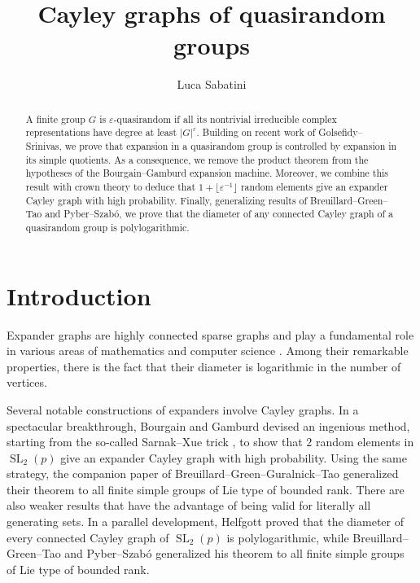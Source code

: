 \documentclass[11pt,reqno]{amsart}
\author[Luca Sabatini]{Luca Sabatini}
\numberwithin{equation}{section}
\theoremstyle{definition}
\theoremstyle{remark}
\newcommand{\SL}{\mathop{\mathrm{SL}}}
\begin{document}
 
 \title[Cayley graphs of quasirandom groups]{Cayley graphs of quasirandom groups} 

\maketitle 

\begin{abstract} 
A finite group $G$ is $\varepsilon$-quasirandom
if all its nontrivial irreducible complex representations
have degree at least $|G|^\varepsilon$.
Building on recent work of Golsefidy--Srinivas,
we prove that expansion in a quasirandom group is controlled by
expansion in its simple quotients.
As a consequence, we remove the product theorem from the hypotheses of
the Bourgain--Gamburd expansion machine.
Moreover, we combine this result with crown theory to deduce that $1 + \lfloor \varepsilon^{-1} \rfloor$
random elements give an expander Cayley graph with high probability.
Finally, generalizing results of Breuillard--Green--Tao and Pyber--Szab\'o,
we prove that the diameter of any connected Cayley graph of a quasirandom group is polylogarithmic.
\end{abstract} 


\vspace{0.2cm}
\section{Introduction} 

Expander graphs are highly connected sparse graphs and play a fundamental role
in various areas of mathematics and computer science \cite{HLW06,Lub12}.
Among their remarkable properties,
there is the fact that their diameter is logarithmic in the number of vertices.

Several notable constructions of expanders involve Cayley graphs.
In a spectacular breakthrough, Bourgain and Gamburd \cite{BG08} devised an ingenious method,
starting from the so-called Sarnak--Xue trick \cite{SX91},
to show that $2$ random elements in $\SL_2(p)$ give an expander Cayley graph with high probability.
Using the same strategy,
the companion paper of Breuillard--Green--Guralnick--Tao \cite{BGGT15} generalized their theorem
to all finite simple groups of Lie type of bounded rank. 
There are also weaker results that have the advantage of being valid for literally all generating sets.
In a parallel development,
Helfgott \cite{Hel08} proved that the diameter of every connected Cayley graph of $\SL_2(p)$ is polylogarithmic,
while Breuillard--Green--Tao \cite{BGT11} and Pyber--Szab\'o \cite{PS16} generalized
his theorem to all finite simple groups of Lie type of bounded rank.
\end{document}
